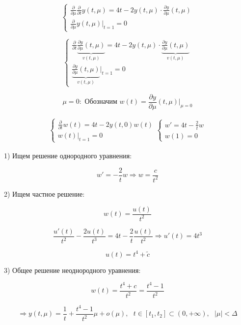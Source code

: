 \documentclass[12pt, a4paper]{report}
\begin{document}
\[ \begin{cases}
    \displaystyle \frac{\partial  }{\partial  \mu } \frac{\partial  }{\partial  t } y(t ,\mu ) = 4 t - 2 y(t,\mu)   \cdot \frac{\partial  y }{\partial  \mu }(t,\mu ) \\
    \displaystyle \frac{\partial  }{\partial  \mu } y (t,\mu ) |_{t =1 }  =0 
\end{cases} \] 

\[ \begin{cases}
\displaystyle \frac{\partial  }{\partial  t } \underbrace{\frac{\partial  y }{\partial  \mu } (t ,\mu )}_{ v(t, \mu)} = 4 t - 2 y ( t, \mu ) \cdot \underbrace{\frac{\partial  y }{\partial  \mu } (t ,\mu )}_{ v(t, \mu)}   \\
\displaystyle \underbrace{\frac{\partial  y }{\partial  \mu } (t ,\mu )}_{ v(t, \mu)}|_{t =1 }  =0 
\end{cases} \] 

\[ \mu = 0 : \text{ Обозначим } w (t ) = \frac{\partial  y } {\partial  \mu } (t , \mu ) |_{\mu =0}    \] 

\[\begin{aligned}
    \begin{cases}
        \displaystyle \frac{\partial  }{\partial  t }w (t ) = 4 t - 2 y (t, 0 ) w (t ) \\ 
        w(t ) |_{t =1} = 0  
    \end{cases}
    \begin{cases}
    \displaystyle w' = 4 t - \frac{2}{t }  w \\ 
    w(1 ) = 0
    \end{cases}
\end{aligned} \] 

1) Ищем решение однородного уравнения: 

\[ \displaystyle w ' = -\frac{2}{t } w \Rightarrow  w  =  \frac{c}{t ^2 }  \]

2) Ищем частное решение: 

\[ \displaystyle  w( t ) = \frac{ u (t )}{t ^2 }   \] 

\[ \frac{ u ' (t )}{t ^2 } - \frac{ 2 u(t )}{t ^3} = 4 t - \frac{2}{t }  \frac{u (t )}{t ^2 } \Rightarrow u'(t ) = 4 t ^3    \] 

\[ u(t ) = t ^4 + \tilde{c }\] 

3) Общее решение неоднородного уравнения: 

\[ w(t ) =  \frac{ t ^{ 4 }  + c }{t ^2 } = \frac{ t ^{ 4 } -1       }{ t ^2 }   \] 

\[ \Rightarrow y (t ,\mu ) = \frac{1}{t } + \frac{ t ^ 4 - 1 }{t ^2 } \mu + o(\mu ) , \text{ }  t \in  [t_1 ,t_2 ] \subset (0, + \infty  ) , \text{ }  |\mu     |< \Delta   \] 
\end{document}

